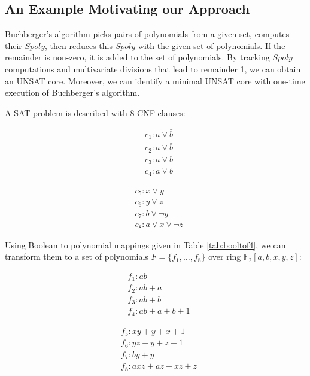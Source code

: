 \subsection{An Example Motivating our Approach}

Buchberger's algorithm picks pairs of polynomials from a given set, computes their $Spoly$, then reduces this $Spoly$
with the given set of polynomials. If the remainder is non-zero,
it is added to the set of polynomials.
By tracking $Spoly$ computations and multivariate divisions that lead to remainder 
1, we can obtain an UNSAT core. Moreover, we can identify a minimal UNSAT core with one-time
 execution of Buchberger's algorithm.

\begin{Example}
A SAT problem is described with 8 CNF clauses:

\begin{minipage}[h]{0.3\textwidth}
\begin{align*}
&c_1: \bar{a}\lor\bar{b}\\
&c_2: a\lor\bar{b}\\
&c_3: \bar{a}\lor b\\
&c_4: a\lor b
\end{align*}
\end{minipage}
\begin{minipage}[h]{0.7\textwidth}
\begin{align*}
&c_5: x\lor y\\
&c_6: y\lor z\\
&c_7: b\lor \neg y\\
&c_8: a\lor x\lor \neg z
\end{align*}
\end{minipage}

\vspace{0.1in}
Using Boolean to polynomial mappings given in Table \ref{tab:booltof4}, we can transform them to a set of
polynomials $F=\{f_1,\dots,f_8\}$ over ring $\mathbb F_2[a,b,x,y,z]$:

\begin{minipage}[h]{0.4\textwidth}
\begin{align*}
&f_1:ab\\
&f_2:ab+a\\
&f_3:ab+b\\
&f_4:ab+a+b+1
\end{align*}
\end{minipage}
\begin{minipage}[h]{0.6\textwidth}
\begin{align*}
&f_5:xy+y+x+1\\
&f_6:yz+y+z+1\\
&f_7:by+y\\
&f_8:axz+az+xz+z
\end{align*}
\end{minipage}


\end{Example}
